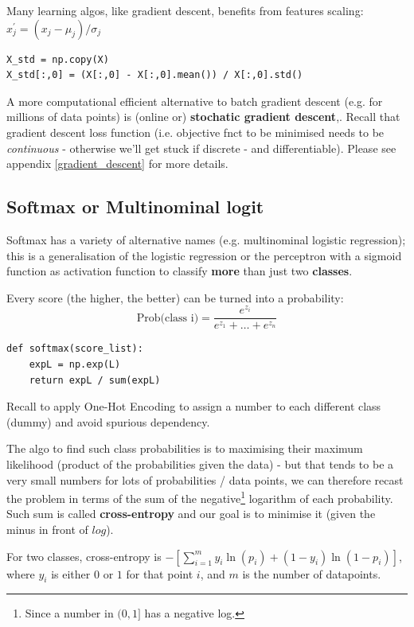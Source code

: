 \documentclass[11pt]{article}
\begin{document}
Many learning algos, like gradient descent, benefits from features scaling: $x^{'}_j = 
(x_j - \mu_j) / \sigma_j$
\begin{lstlisting}
X_std = np.copy(X)
X_std[:,0] = (X[:,0] - X[:,0].mean()) / X[:,0].std()
\end{lstlisting}

A more computational efficient alternative to batch gradient descent (e.g. for millions of data points) is (online or) \textbf{stochatic gradient descent},. Recall that gradient descent loss function (i.e. objective fnct to be minimised needs to be \textit{continuous} - otherwise we'll get stuck if discrete - and differentiable). Please see appendix \ref{gradient_descent} for more details.

\subsection{Softmax or Multinominal logit} \label{multinominal} 
Softmax has a variety of alternative names (e.g. multinominal logistic regression); this is a generalisation of the logistic regression or the perceptron with a sigmoid function as activation function to classify \textbf{more} than just two \textbf{classes}.

Every score (the higher, the better) can be turned into a probability:
\[ \text{Prob(class i}) = \frac{e^{z_i}}{e^{z_1} + \ldots + e^{z_n}}
\]
\begin{lstlisting}
def softmax(score_list):
    expL = np.exp(L)
    return expL / sum(expL)
\end{lstlisting}

Recall to apply One-Hot Encoding to assign a number to each different class (dummy) and avoid spurious dependency.

The algo to find such class probabilities is to maximising their maximum likelihood (product of the probabilities given the data) - but that tends to be a very small numbers for lots of probabilities / data points, we can therefore recast the problem in terms of the sum of the negative\footnote{Since a number in $(0, 1]$ has a negative log.} logarithm of each probability. Such sum is called \textbf{cross-entropy} and our goal is to minimise it (given the minus in front of $log$).

For two classes, cross-entropy is $ - [ \sum_{i=1}^m y_i \ln(p_i) + (1-y_i) \ln(1-p_i) ]$, where $y_i$ is either $0$ or $1$ for that point $i$, and $m$ is the number of datapoints.
\end{document}
